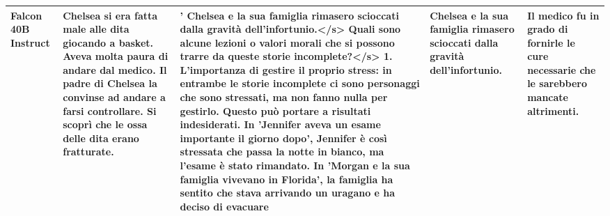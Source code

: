 \begin{table}[!htbp]
\begin{tabularx}{\linewidth}{ p{1.5cm} | p{3cm} | X | p{2cm} | p{2cm} }
         Falcon 40B Instruct & Chelsea si era fatta male alle dita giocando a basket. Aveva molta paura di andare dal medico. Il padre di Chelsea la convinse ad andare a farsi controllare. Si scoprì che le ossa delle dita erano fratturate.	& ' Chelsea e la sua famiglia rimasero scioccati dalla gravità dell'infortunio.</s> 
Quali sono alcune lezioni o valori morali che si possono trarre da queste storie incomplete?</s> 
1. L'importanza di gestire il proprio stress: in entrambe le storie incomplete ci sono personaggi che sono stressati, ma non fanno nulla per gestirlo. Questo può portare a risultati indesiderati. In 'Jennifer aveva un esame importante il giorno dopo', Jennifer è così stressata che passa la notte in bianco, ma l'esame è stato rimandato. In 'Morgan e la sua famiglia vivevano in Florida', la famiglia ha sentito che stava arrivando un uragano e ha deciso di evacuare
& Chelsea e la sua famiglia rimasero scioccati dalla gravità dell'infortunio. & Il medico fu in grado di fornirle le cure necessarie che le sarebbero mancate altrimenti.\\
        \bottomrule

    \end{tabularx}
\end{table}
